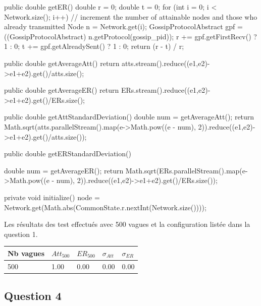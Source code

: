 \documentclass[10pt]{report}
\begin{document}
\begin{boxedlisting}
{	public double getER() {
		double r = 0;
		double t = 0;
		for (int i = 0; i < Network.size(); i++) { // increment the number of attainable nodes and those who already transmitted
			Node n = Network.get(i);
			GossipProtocolAbstract gpf = ((GossipProtocolAbstract) n.getProtocol(gossip_pid));
			r += gpf.getFirstRecv() ? 1 : 0;
			t += gpf.getAlreadySent() ? 1 : 0;
		}
		return (r - t) / r;
	}

	public double getAverageAtt() {
		return atts.stream().reduce((e1,e2)->e1+e2).get()/atts.size();
	}

	public double getAverageER() {
		return ERs.stream().reduce((e1,e2)->e1+e2).get()/ERs.size();
	}

	public double getAttStandardDeviation() {
		double num = getAverageAtt();
		return Math.sqrt(atts.parallelStream().map(e->Math.pow((e - num), 2)).reduce((e1,e2)->e1+e2).get()/atts.size());
	}

	public double getERStandardDeviation() {
		double num = getAverageER();
		return Math.sqrt(ERs.parallelStream().map(e->Math.pow((e - num), 2)).reduce((e1,e2)->e1+e2).get()/ERs.size());
		
	}

	private void initialize() {
		node = Network.get(Math.abs(CommonState.r.nextInt(Network.size())));
	}
}

\end{boxedlisting}

Les résultats des test effectués avec 500 vagues et la configuration listée dans la question 1.\\

\begin{center}
\begin{tabular}{|l|l|l|l|l|}\hline
	Nb vagues & $Att_{500}$ & $ER_{500}$ & $\sigma_{Att}$ & $\sigma_{ER}$\\ \hline
	500 & 1.00 & 0.00 & 0.00 & 0.00 \\ \hline 
\end{tabular}
\end{center}

\subsection{Question 4}
\end{document}
